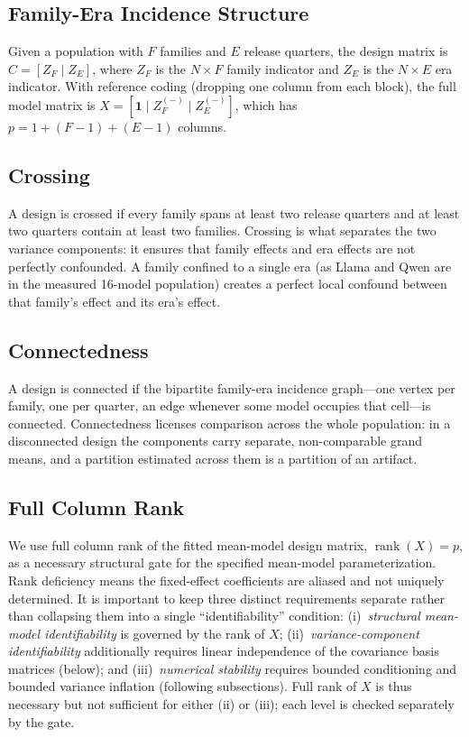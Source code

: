 \documentclass{ieeeaccess}
\theoremstyle{definition}
\theoremstyle{plain}
\begin{document}
\subsection{Family-Era Incidence Structure}
Given a population with $F$ families and $E$ release quarters, the design matrix is $C = [Z_F \mid Z_E]$, where $Z_F$ is the $N \times F$ family indicator and $Z_E$ is the $N \times E$ era indicator. With reference coding (dropping one column from each block), the full model matrix is $X = [\mathbf{1} \mid Z_F^{(-)} \mid Z_E^{(-)}]$, which has $p = 1 + (F-1) + (E-1)$ columns.

\subsection{Crossing}
A design is crossed if every family spans at least two release quarters and at least two quarters contain at least two families. Crossing is what separates the two variance components: it ensures that family effects and era effects are not perfectly confounded. A family confined to a single era (as Llama and Qwen are in the measured 16-model population) creates a perfect local confound between that family's effect and its era's effect.

\subsection{Connectedness}
A design is connected if the bipartite family-era incidence graph---one vertex per family, one per quarter, an edge whenever some model occupies that cell---is connected. Connectedness licenses comparison across the whole population: in a disconnected design the components carry separate, non-comparable grand means, and a partition estimated across them is a partition of an artifact.

\subsection{Full Column Rank}
We use full column rank of the fitted mean-model design matrix, $\operatorname{rank}(X) = p$, as a necessary structural gate for the specified mean-model parameterization. Rank deficiency means the fixed-effect coefficients are aliased and not uniquely determined. It is important to keep three distinct requirements separate rather than collapsing them into a single ``identifiability'' condition: (i)~\emph{structural mean-model identifiability} is governed by the rank of $X$; (ii)~\emph{variance-component identifiability} additionally requires linear independence of the covariance basis matrices (below); and (iii)~\emph{numerical stability} requires bounded conditioning and bounded variance inflation (following subsections). Full rank of $X$ is thus necessary but not sufficient for either (ii) or (iii); each level is checked separately by the gate.
\end{document}
